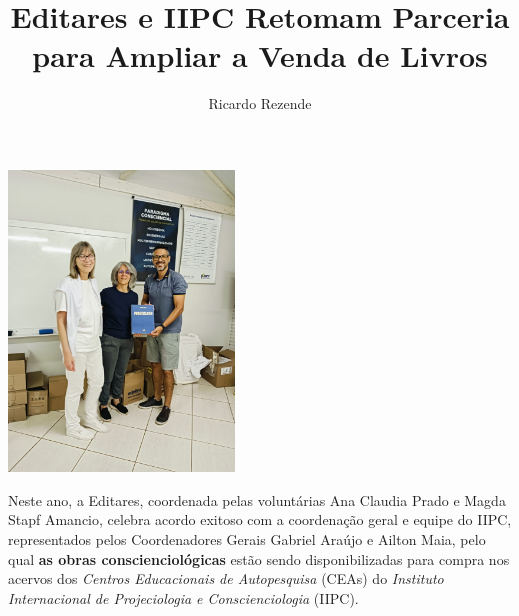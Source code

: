 \documentclass{gescons}
\author{Ricardo Rezende}
\title{Editares e IIPC Retomam Parceria para Ampliar a Venda de Livros}
\begin{document}
    \makeentrevistatitle


    
    

\begin{center}
    \includegraphics[height=8cm,trim={130 200 100 300},clip]{articles/parceria/imagens/editares-iipc.jpeg}
\end{center}


    



\vspace{5mm}

Neste ano, a Editares, coordenada pelas voluntárias Ana Claudia Prado e Magda Stapf Amancio, celebra acordo exitoso com a coordenação geral e equipe do IIPC, representados pelos Coordenadores Gerais Gabriel Araújo e Ailton Maia, pelo qual \textbf{as obras conscienciológicas} estão sendo disponibilizadas para compra nos acervos dos \emph{Centros Educacionais de Autopesquisa} (CEAs) do \emph{Instituto Internacional de Projeciologia e Cons­cienciologia} (IIPC).
\end{document}

